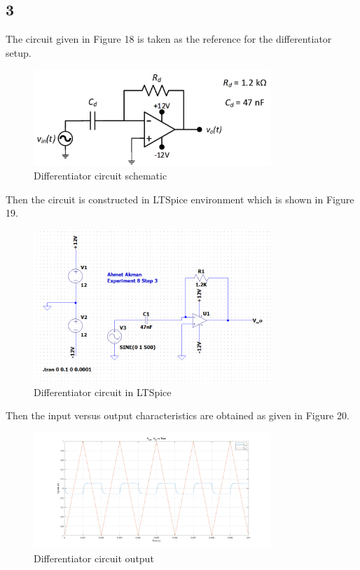 \documentclass[letterpaper,12pt]{article}
\begin{document}
\subsection{3}
The circuit given in Figure 18 is taken as the reference for the differentiator setup.
\begin{figure}[H]
	\centering
   \includegraphics[width=0.8\textwidth]{differentiator.png}
   \caption{Differentiator circuit schematic}
\end{figure} 
Then the circuit is constructed in LTSpice environment which is shown in Figure 19.
\begin{figure}[H]
	\centering
   \includegraphics[width=0.8\textwidth]{differentiator_sim.png}
   \caption{Differentiator circuit in LTSpice}
\end{figure} 
Then the input versus output characteristics are obtained as given in Figure 20.
\begin{figure}[H]
	\centering
   \includegraphics[width=0.8\textwidth]{differentiator_1.png}
   \caption{Differentiator circuit output}
\end{figure} 
\end{document}
